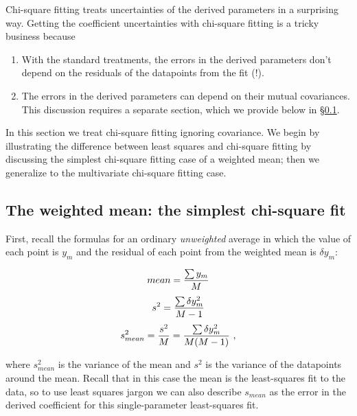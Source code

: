 \documentclass[psfig,preprint]{aastex}
\begin{document}
	Chi-square fitting treats uncertainties of the derived
parameters in a surprising way. Getting the 
coefficient uncertainties with chi-square fitting is a tricky business 
because \begin{enumerate}

\item With the standard treatments, the errors in the derived parameters
don't depend on the residuals of the datapoints from the fit (!).

\item The errors in the derived parameters can depend on their mutual
covariances. This discussion requires a separate section, which we
provide below in \S \ref{chicoeffsnoco}. 

\end{enumerate}

\noindent In this section we treat chi-square fitting ignoring
covariance. We begin by illustrating the difference between least
squares and chi-square fitting by discussing the simplest chi-square
fitting case of a weighted mean; then we generalize to the multivariate
chi-square fitting case. 

\subsection{ The weighted mean: the simplest chi-square fit}

\label{chicoeffsnoco}

        First, recall the formulas for an ordinary {\it unweighted}  
average in which the value of each point is $y_m$ and the residual of
each point from the weighted mean is $\delta y_m$:

\begin{mathletters}
\begin{equation}
mean = {\sum y_m \over M}
\end{equation}
\begin{equation}
s^2 = {\sum \delta y_m^2 \over M-1}
\end{equation}
\begin{equation} \label{meanvariance}
s_{mean}^2  = {s^2 \over M} = {\sum \delta y_m^2 \over M(M-1)} \ ,
\end{equation}
\end{mathletters}

\noindent where $s_{mean}^2$ is the variance of the mean and $s^2$
is the variance of the datapoints around the mean.  Recall that in this
case the mean is the least-squares fit to the data, so to use least squares
jargon we can also describe $s_{mean}$ as the error in the derived
coefficient for this single-parameter least-squares fit.
\end{document}
